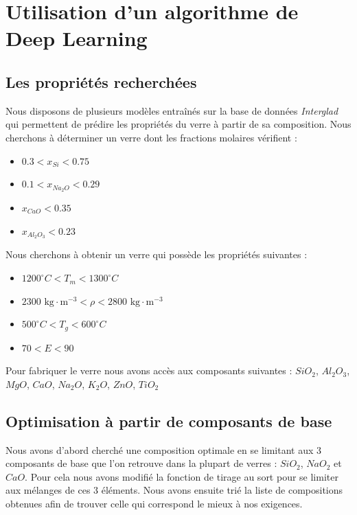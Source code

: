 \documentclass{article}
\begin{document}
\section{Utilisation d'un algorithme de Deep Learning}
\subsection{Les propriétés recherchées}

Nous disposons de plusieurs modèles entraînés sur la base de données \textit{Interglad} qui permettent de prédire les propriétés du verre à partir de sa composition. Nous cherchons à déterminer un verre dont les fractions molaires vérifient :

\begin{itemize}
    \item $0.3 < x_{Si} < 0.75$
    \item $0.1 < x_{Na_2O} < 0.29$
    \item $x_{CaO} < 0.35$
    \item $x_{Al_2O_3} < 0.23$
\end{itemize} 

Nous cherchons à obtenir un verre qui possède les propriétés suivantes :

\begin{itemize}
    \item $1200 ^{\circ} C < T_m < 1300 ^{\circ} C$
    \item $2300 \text{ kg} \cdot \text{m}^{-3} < \rho < 2800 \text{ kg} \cdot \text{m}^{-3}$
    \item $500 ^{\circ} C < T_g < 600 ^{\circ} C$
    \item $70 < E < 90$
\end{itemize}

Pour fabriquer le verre nous avons accès aux composants suivantes : $SiO_2$, $Al_2O_3$, $MgO$, $CaO$, $Na_2O$, $K_2O$, $ZnO$, $TiO_2$

\subsection{Optimisation à partir de composants de base}

Nous avons d'abord cherché une composition optimale en se limitant aux 3 composants de base que l'on retrouve dans la plupart de verres : $SiO_2$, $NaO_2$ et $CaO$. Pour cela nous avons modifié la fonction de tirage au sort pour se limiter aux mélanges de ces 3 éléments. Nous avons ensuite trié la liste de compositions obtenues afin de trouver celle qui correspond le mieux à nos exigences.
\end{document}
